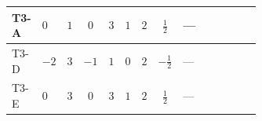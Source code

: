 \documentclass[8pt]{article}
\begin{document}
\begin{landscape}
\begin{longtable}{@{}llcccccc >{\raggedright\arraybackslash}p{0.21\linewidth} >{\raggedright\arraybackslash}p{0.21\linewidth} >{\raggedright\arraybackslash}p{0.21\linewidth}@{}}
\midrule
T3-A & $0$ & $1$ & $0$ & $3$ & $1$ & $2$ & $\frac{1}{2}$ & --- & \scriptsize\adjustbox{max width=\linewidth}{$\begin{gathered} +4 {\lambda_{T3}} \left({\lambda_{T3}}\right)^{*}\end{gathered}$} & \scriptsize\adjustbox{max width=\linewidth}{$\begin{gathered} +\frac{9 {g_2}^4}{4}\end{gathered}$} \\
\midrule
T3-D & $-2$ & $3$ & $-1$ & $1$ & $0$ & $2$ & $-\frac{1}{2}$ & --- & \scriptsize\adjustbox{max width=\linewidth}{$\begin{gathered} +4 {\lambda_{T3}} \left({\lambda_{T3}}\right)^{*}\end{gathered}$} & \scriptsize\adjustbox{max width=\linewidth}{$\begin{gathered} +\frac{9 {g_2}^4}{4}\end{gathered}$} \\
\midrule
T3-E & $0$ & $3$ & $0$ & $3$ & $1$ & $2$ & $\frac{1}{2}$ & --- & \scriptsize\adjustbox{max width=\linewidth}{$\begin{gathered} +4 {\lambda_{T3}} \left({\lambda_{T3}}\right)^{*}\end{gathered}$} & \scriptsize\adjustbox{max width=\linewidth}{$\begin{gathered} +\frac{9 {g_2}^4}{4}\end{gathered}$} \\
\midrule
\bottomrule
\end{longtable}
\clearpage

\end{landscape}
\end{document}

